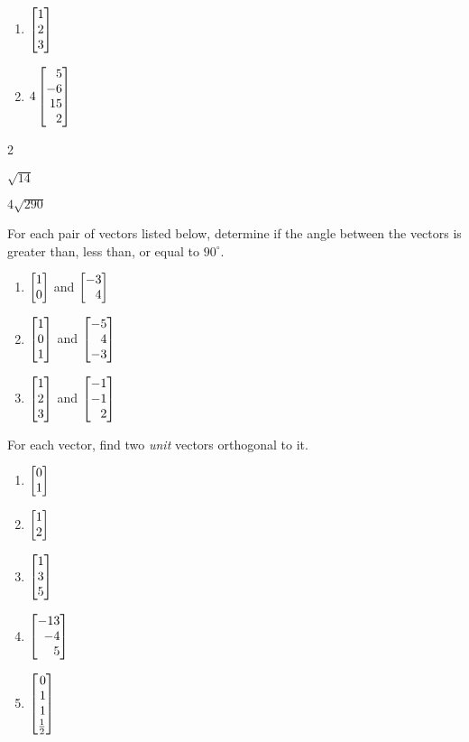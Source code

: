 \begin{exercises}
\begin{problist}
\begin{enumerate}
			\item $\mat{1\\2\\3}$
			\item $4\mat{5\\-6\\15\\2}$
		\end{enumerate}
		\begin{solution}
			\begin{enumerate*}
				\item 2 
				\item $\sqrt{14}$ 
				\item $4\sqrt{290}$ 
			\end{enumerate*}
		\end{solution}
		\prob For each pair of vectors listed below, determine if the angle between the vectors is greater than,
		less than, or equal to $90^\circ$.
		\begin{enumerate}
			\item $\mat{1\\0}$ and $\mat{-3\\4}$
			\item $\mat{1\\0\\1}$ and $\mat{-5\\4\\-3}$
			\item $\mat{1\\2\\3}$ and $\mat{-1\\-1\\2}$
		\end{enumerate}
		\begin{solution}
		
		\end{solution}
		\prob For each vector, find two \emph{unit} vectors orthogonal to it.
		\begin{enumerate}
			\item $\mat{0\\1}$
			\item $\mat{1\\2}$
			\item $\mat{1\\3\\5}$
			\item $\mat{-13\\-4\\5}$
			\item $\mat{0\\1\\1\\\frac{1}{2}}$
		\end{enumerate}
		\begin{solution}
		

\end{solution}
\end{problist}
\end{exercises}

